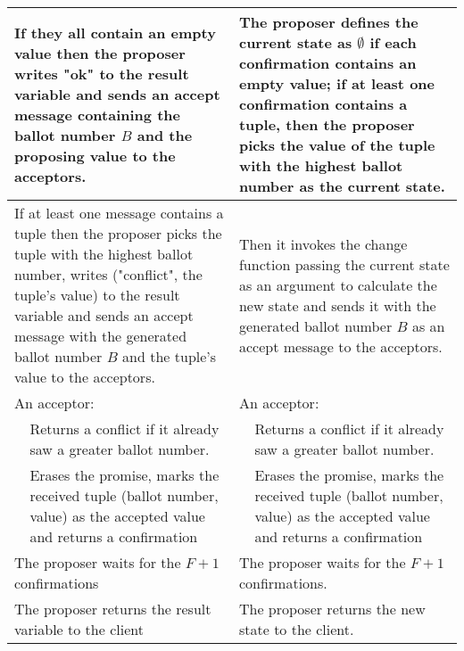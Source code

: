 \documentclass[12pt]{article}
\theoremstyle{definition}
\begin{document}
\begin{center}
\begin{longtable}{p{2em}p{13em}|p{2em}p{13em}}
  \hline
  
  \multicolumn{2}{p{15em}|}{If they all contain an empty value then the proposer writes "ok" to the result variable and sends an accept message containing the ballot number $B$ and the proposing value to the acceptors.}
  &
  \multicolumn{2}{p{15em}}{The proposer defines the current state as $\emptyset$ if each confirmation contains an empty value; if at least one confirmation contains a tuple, then the proposer picks the value of the tuple with the highest ballot number as the current state.}
  \\
  
  \hline
  
  \multicolumn{2}{p{15em}|}{If at least one message contains a tuple then the proposer picks the tuple with the highest ballot number, writes ("conflict", the tuple's value) to the result variable and sends an accept message with the generated ballot number $B$ and the tuple's value to the acceptors.}
  &
  \multicolumn{2}{p{15em}}{Then it invokes the change function passing the current state as an argument to calculate the new state and sends it with the generated ballot number $B$ as an accept message to the acceptors.}
  \\
  
  \hline
  
  \multicolumn{2}{p{15em}|}{An acceptor:}
  &
  \multicolumn{2}{p{15em}}{An acceptor:} \\[6pt]
  
  
  &
  Returns a conflict if it already saw a greater ballot number.
  &
  &
  Returns a conflict if it already saw a greater ballot number.
  \\[6pt]
  
  
  &
  Erases the promise, marks the received tuple (ballot number, value) as the accepted value and returns a confirmation
  &
  &
  Erases the promise, marks the received tuple (ballot number, value) as the accepted value and returns a confirmation
  \\[6pt]
  
  \hline
  
  \multicolumn{2}{p{15em}|}{The proposer waits for the $F+1$ confirmations}
  &
  \multicolumn{2}{p{15em}}{The proposer waits for the $F+1$ confirmations.} \\[6pt]
  
  \hline
  
  \multicolumn{2}{p{15em}|}{The proposer returns the result variable to the client}
  &
  \multicolumn{2}{p{15em}}{The proposer returns the new state to the client.} \\[6pt]
  
  \hline
\end{longtable}
\end{center}
\end{document}
